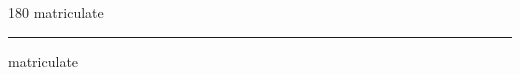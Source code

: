 
\begin{frame}
\begin{center}
\begin{turn}{180}
{\fontsize{2.5cm}{1em}\selectfont matriculate}
\end{turn}
\vspace{1em}\par  
\hrule
\vspace{1em}\par  
{\fontsize{2.5cm}{1em}\selectfont matriculate}
\end{center}
\end{frame}
